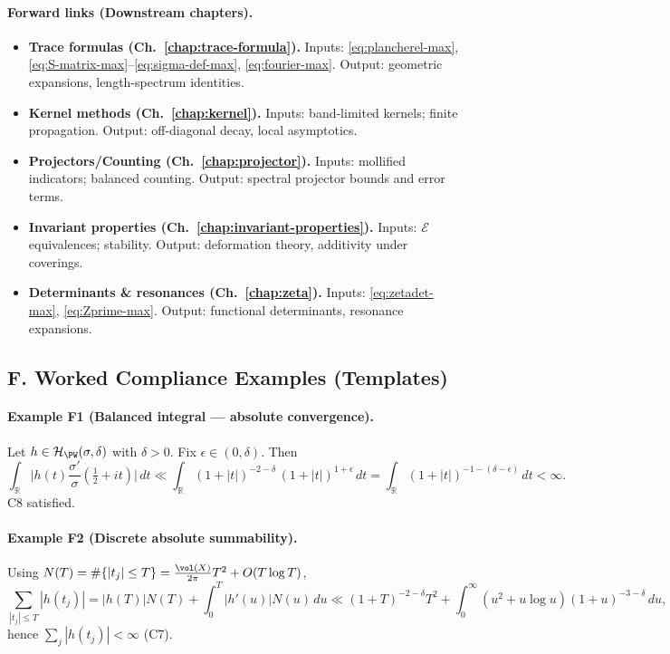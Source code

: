 \paragraph{Forward links (Downstream chapters).}
\begin{itemize}
  \item \textbf{Trace formulas (Ch.~\ref{chap:trace-formula}).} Inputs: \eqref{eq:plancherel-max}, \eqref{eq:S-matrix-max}–\eqref{eq:sigma-def-max}, \eqref{eq:fourier-max}. Output: geometric expansions, length-spectrum identities.
  \item \textbf{Kernel methods (Ch.~\ref{chap:kernel}).} Inputs: band-limited kernels; finite propagation. Output: off-diagonal decay, local asymptotics.
  \item \textbf{Projectors/Counting (Ch.~\ref{chap:projector}).} Inputs: mollified indicators; balanced counting. Output: spectral projector bounds and error terms.
  \item \textbf{Invariant properties (Ch.~\ref{chap:invariant-properties}).} Inputs: $\mathcal E$ equivalences; stability. Output: deformation theory, additivity under coverings.
  \item \textbf{Determinants \& resonances (Ch.~\ref{chap:zeta}).} Inputs: \eqref{eq:zetadet-max}, \eqref{eq:Zprime-max}. Output: functional determinants, resonance expansions.
\end{itemize}


\subsection*{F. Worked Compliance Examples (Templates)}
\label{subsec:worked-compliance-max}

\paragraph{Example F1 (Balanced integral — absolute convergence).}
Let $h\in\mathcal H_{\PW}(\sigma,\delta)$ with $\delta>0$. Fix $\epsilon\in(0,\delta)$. Then
\[
\int_{\mathbb R}\Big|h(t)\frac{\sigma'}{\sigma}(\tfrac12+it)\Big|\,dt
\ll \int_{\mathbb R} (1+|t|)^{-2-\delta}\,(1+|t|)^{1+\epsilon}\,dt
= \int_{\mathbb R}(1+|t|)^{-1-(\delta-\epsilon)}\,dt<\infty.
\]
C8 satisfied.

\paragraph{Example F2 (Discrete absolute summability).}
Using $N(T)=\#\{|t_j|\le T\}=\frac{\vol(X)}{2\pi}T^2+O(T\log T)$,
\[
\sum_{|t_j|\le T}|h(t_j)|=|h(T)|N(T)+\int_0^T |h'(u)|N(u)\,du
\ll (1+T)^{-2-\delta}T^2 + \int_0^\infty (u^2+u\log u)(1+u)^{-3-\delta}\,du,
\]
hence $\sum_j|h(t_j)|<\infty$ (C7).

